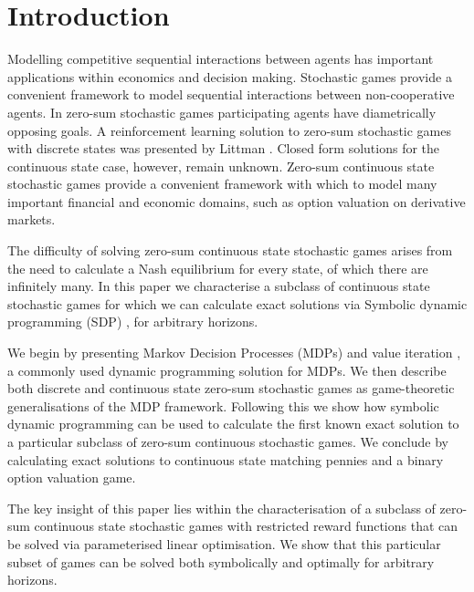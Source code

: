 \section{Introduction}

Modelling competitive sequential interactions between agents has 
important applications within economics and decision making. 
Stochastic games \cite{Shapley_PotNAoS_1953} provide a convenient framework 
to model sequential interactions between non-cooperative agents. In 
zero-sum stochastic games participating agents have diametrically 
opposing goals. A reinforcement learning solution to zero-sum stochastic
games with discrete states was presented by Littman \cite{Littman_ICML_1994}.
Closed form solutions for the continuous state case, however, remain unknown. 
Zero-sum continuous state stochastic games provide a convenient framework with 
which to model many important financial and economic domains, such 
as option valuation on derivative markets.

The difficulty of solving zero-sum continuous state stochastic games
arises from the need to calculate a Nash equilibrium for every state,
of which there are infinitely many. In this paper we characterise a subclass of 
continuous state stochastic games for which we can calculate exact solutions
via Symbolic dynamic programming (SDP)  \cite{Boutilier_IJCAI_2001},
for arbitrary horizons.

We begin by presenting Markov Decision Processes (MDPs) \cite{Howard_1960} 
and value iteration \cite{Bellman_1957}, a commonly used dynamic programming
solution for MDPs. We then describe both discrete and continuous state 
zero-sum stochastic games as game-theoretic generalisations of the MDP framework. 
Following this we show how symbolic dynamic programming
can be used to calculate the first known exact solution to a particular subclass of 
zero-sum continuous stochastic games. We conclude by calculating
exact solutions to continuous state matching pennies and a binary
option valuation game.

The key insight of this paper lies within the characterisation of a subclass
of zero-sum continuous state stochastic games with restricted reward
functions that can be solved via parameterised linear optimisation. We 
show that this particular subset of games can be solved both symbolically and optimally
for arbitrary horizons.
